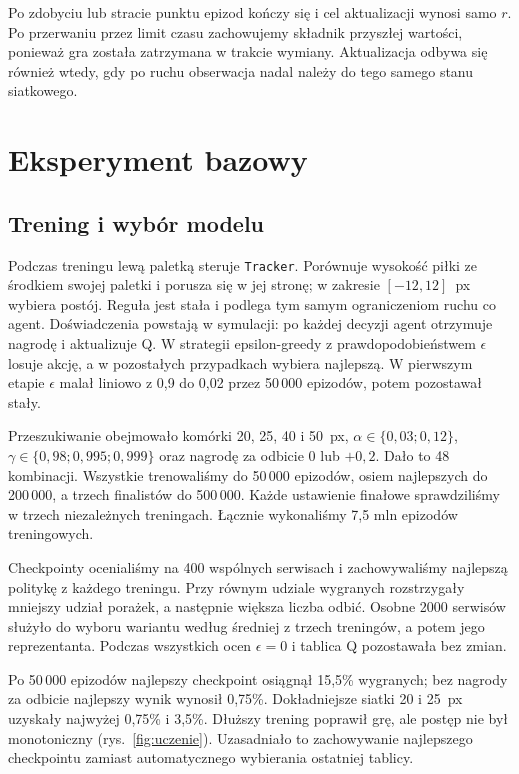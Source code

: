 \documentclass[11pt,a4paper]{article}
\begin{document}
Po zdobyciu lub stracie punktu epizod kończy się i cel aktualizacji
wynosi samo $r$. Po przerwaniu przez limit czasu zachowujemy składnik
przyszłej wartości, ponieważ gra została zatrzymana w trakcie wymiany.
Aktualizacja odbywa się również wtedy, gdy po ruchu obserwacja nadal
należy do tego samego stanu siatkowego.

\section{Eksperyment bazowy}
\label{sec:baza}

\subsection{Trening i wybór modelu}

Podczas treningu lewą paletką steruje \texttt{Tracker}. Porównuje
wysokość piłki ze środkiem swojej paletki i porusza się w jej stronę;
w zakresie $[-12,12]$~px wybiera postój. Reguła jest stała i podlega
tym samym ograniczeniom ruchu co agent. Doświadczenia powstają
w symulacji: po każdej decyzji agent otrzymuje nagrodę i aktualizuje Q.
W strategii epsilon-greedy z prawdopodobieństwem $\epsilon$ losuje
akcję, a w pozostałych przypadkach wybiera najlepszą. W pierwszym
etapie $\epsilon$ malał liniowo z 0,9 do 0,02 przez 50\,000 epizodów,
potem pozostawał stały.

Przeszukiwanie obejmowało komórki 20, 25, 40 i 50~px,
$\alpha\in\{0{,}03;0{,}12\}$, $\gamma\in\{0{,}98;0{,}995;0{,}999\}$
oraz nagrodę za odbicie 0 lub $+0{,}2$. Dało to 48 kombinacji.
Wszystkie trenowaliśmy do 50\,000 epizodów, osiem
najlepszych do 200\,000, a trzech finalistów do 500\,000.
Każde ustawienie finałowe sprawdziliśmy w trzech niezależnych
treningach. Łącznie wykonaliśmy 7,5 mln epizodów treningowych.

Checkpointy ocenialiśmy na 400 wspólnych serwisach i zachowywaliśmy
najlepszą politykę z każdego
treningu. Przy równym udziale wygranych rozstrzygały mniejszy udział
porażek, a następnie większa liczba odbić. Osobne 2000 serwisów
służyło do wyboru wariantu według średniej z trzech treningów,
a potem jego reprezentanta.
Podczas wszystkich ocen $\epsilon=0$ i tablica Q pozostawała bez zmian.

Po 50\,000 epizodów najlepszy checkpoint osiągnął 15,5\% wygranych;
bez nagrody za odbicie najlepszy wynik wynosił 0,75\%.
Dokładniejsze siatki 20 i 25~px uzyskały najwyżej 0,75\% i 3,5\%.
Dłuższy trening poprawił grę, ale postęp nie był monotoniczny
(rys.~\ref{fig:uczenie}). Uzasadniało to zachowywanie najlepszego
checkpointu zamiast automatycznego wybierania ostatniej tablicy.
\end{document}
